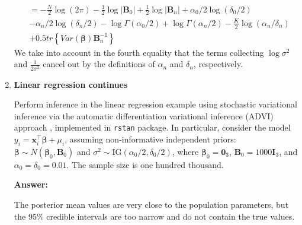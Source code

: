\begin{enumerate}[leftmargin=*]
\begin{align*}
	&=-\frac{N}{2}\log (2\pi)-\frac{1}{2}\log|\boldsymbol{B}_0|+\frac{1}{2}\log|\boldsymbol{B}_n|+\alpha_0/2\log(\delta_0/2)\\
	&-\alpha_n/2\log(\delta_n/2)-\log\Gamma(\alpha_0/2)+\log\Gamma(\alpha_n/2)-\frac{K}{2}\log(\alpha_n/\delta_n)\\
	&+0.5tr\left\{Var(\boldsymbol{\beta})\boldsymbol{B}_n^{-1}\right\}
\end{align*}
We take into account in the fourth equality that the terms collecting $\log\sigma^2$ and $\frac{1}{2\sigma^2}$ cancel out by the definitions of $\alpha_n$ and $\delta_n$, respectively.

\item \textbf{Linear regression continues}

Perform inference in the linear regression example using stochastic variational inference via the automatic differentiation variational inference (ADVI) approach \cite{kucukelbir2017automatic}, implemented in \texttt{rstan} package. In particular, consider the model $y_i = \boldsymbol{x}_i^{\top} \boldsymbol{\beta} + \mu_i$, assuming non-informative independent priors: $\boldsymbol{\beta} \sim N(\boldsymbol{\beta}_0, \boldsymbol{B}_0)$ and $\sigma^2 \sim \mathrm{IG}(\alpha_0/2, \delta_0/2)$, where $\boldsymbol{\beta}_0 = \boldsymbol{0}_3$, $\boldsymbol{B}_0 = 1000\boldsymbol{I}_3$, and $\alpha_0 = \delta_0 = 0.01$. The sample size is one hundred thousand.

\textbf{Answer:}

The posterior mean values are very close to the population parameters, but the 95\% credible intervals are too narrow and do not contain the true values.


\end{enumerate}

